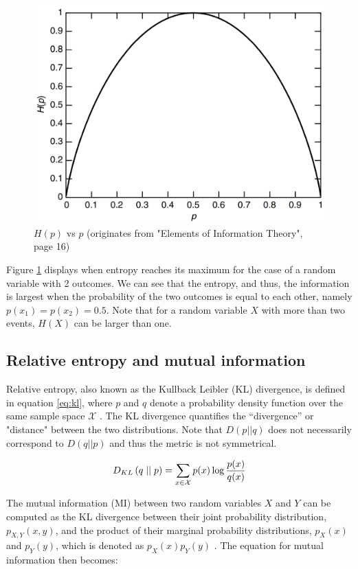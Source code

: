 \begin{figure}[h]
	\centering
	\includegraphics[width=0.4\linewidth]{screenshot005}
	\caption{$H(p)$ vs $p$ (originates from "Elements of Information Theory", page 16)}
	\label{fig:EntropyvsP}
\end{figure}



Figure \ref{fig:EntropyvsP} displays when entropy reaches its maximum for the case of a random variable with 2 outcomes. We can see that the entropy, and thus, the information is largest when the probability of the two outcomes is equal to each other, namely $p(x_1)=p(x_2)=0.5$. Note that for a random variable $X$ with more than two events, $H(X)$ can be larger than one.

\subsection{Relative entropy and mutual information}
Relative entropy, also known as the Kullback Leibler (KL) divergence, is defined in equation \ref{eq:kl}, where $p$ and $q$ denote a probability density function over the same sample space $\mathcal{X}$ \cite{coverELEMENTSINFORMATIONTHEORY}. The KL divergence quantifies the “divergence” or "distance" between the two distributions. Note that $D(p||q)$ does not necessarily correspond to $D(q||p)$ and thus the metric is not symmetrical.

\begin{equation}
	D_{KL} \left( q \mid \mid p \right) = \sum_{x\in\mathcal{X}}p(x) \log \frac{p(x)}{q(x)} \label{eq:kl}
\end{equation}



The mutual information (MI) between two random variables $X$ and $Y$ can be computed as the KL divergence between their joint probability distribution, $p_{X,Y}(x,y)$, and the product of their marginal probability distributions, $p_X(x)$ and $p_Y(y)$, which is denoted as $p_X(x)p_Y(y)$ \cite{coverELEMENTSINFORMATIONTHEORY}. The equation for mutual information then becomes:

